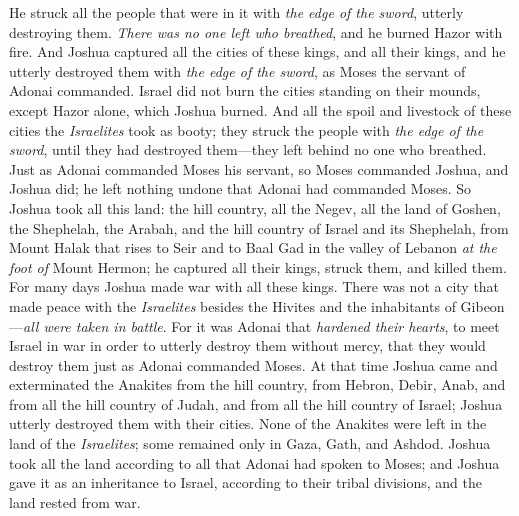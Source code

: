\begin{biblechapter}
\verse He struck all the people that were in it with \textit{the edge of the sword}, utterly destroying them. \textit{There was no one left who breathed}, and he burned Hazor with fire.
\verse And Joshua captured all the cities of these kings, and all their kings, and he utterly destroyed them with \textit{the edge of the sword}, as Moses the servant of Adonai commanded.
\verse Israel did not burn the cities standing on their mounds, except Hazor alone, which Joshua burned.
\verse And all the spoil and livestock of these cities the \textit{Israelites} took as booty; they struck the people with \textit{the edge of the sword}, until they had destroyed them—they left behind no one who breathed.
\verse Just as Adonai commanded Moses his servant, so Moses commanded Joshua, and Joshua did; he left nothing undone that Adonai had commanded Moses.
 So Joshua took all this land: the hill country, all the Negev, all the land of Goshen, the Shephelah, the Arabah, and the hill country of Israel and its Shephelah,
\verse from Mount Halak that rises to Seir and to Baal Gad in the valley of Lebanon \textit{at the foot of} Mount Hermon; he captured all their kings, struck them, and killed them.
\verse For many days Joshua made war with all these kings.
\verse There was not a city that made peace with the \textit{Israelites} besides the Hivites and the inhabitants of Gibeon—\textit{all were taken in battle}.
\verse For it was Adonai that \textit{hardened their hearts}, to meet Israel in war in order to utterly destroy them without mercy, that they would destroy them just as Adonai commanded Moses.
\verse At that time Joshua came and exterminated the Anakites from the hill country, from Hebron, Debir, Anab, and from all the hill country of Judah, and from all the hill country of Israel; Joshua utterly destroyed them with their cities.
\verse None of the Anakites were left in the land of the \textit{Israelites}; some remained only in Gaza, Gath, and Ashdod.
\verse Joshua took all the land according to all that Adonai had spoken to Moses; and Joshua gave it as an inheritance to Israel, according to their tribal divisions, and the land rested from war.
\end{biblechapter}

